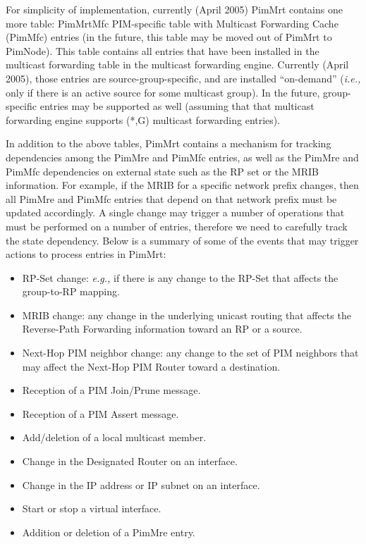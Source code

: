 \documentclass[11pt]{article}
\newcommand{\ie}{\emph{i.e.,}\xspace}
\newcommand{\eg}{\emph{e.g.,}\xspace}
\begin{document}
For simplicity of implementation, currently (April 2005) PimMrt
contains one more table: PimMrtMfc PIM-specific table with Multicast
Forwarding Cache (PimMfc) entries (in the future, this table may be
moved out of PimMrt to PimNode). This table contains all
entries that have been installed in the multicast forwarding table in
the multicast forwarding engine. Currently (April 2005), those
entries are source-group-specific, and are installed ``on-demand'' (\ie
only if there is an active source for some multicast group). In the future,
group-specific entries may be supported as well (assuming that that
multicast forwarding engine supports (*,G) multicast forwarding
entries).

In addition to the above tables, PimMrt contains a mechanism for
tracking dependencies among the PimMre and PimMfc entries, as well as
the PimMre and PimMfc dependencies on external state such as the RP set
or the MRIB information. For example, if the MRIB for a specific network
prefix changes, then all PimMre and PimMfc entries that depend on that
network prefix must be updated accordingly. A single change may trigger
a number of operations that must be performed on a number of entries,
therefore we need to carefully track the state dependency. Below is a
summary of some of the events that may trigger actions to process
entries in PimMrt:

\begin{itemize}

  \item RP-Set change: \eg if there is any change to the RP-Set that
  affects the group-to-RP mapping.

  \item MRIB change: any change in the underlying unicast routing that
  affects the Reverse-Path Forwarding information toward an RP or a
  source.

  \item Next-Hop PIM neighbor change: any change to the set of PIM
  neighbors that may affect the Next-Hop PIM Router toward a destination.

  \item Reception of a PIM Join/Prune message.

  \item Reception of a PIM Assert message.

  \item Add/deletion of a local multicast member.

  \item Change in the Designated Router on an interface.

  \item Change in the IP address or IP subnet on an interface.

  \item Start or stop a virtual interface.

  \item Addition or deletion of a PimMre entry.

\end{itemize}
\end{document}
